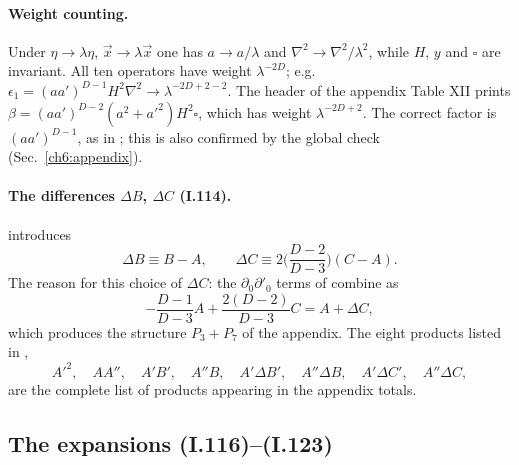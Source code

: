 \paragraph{Weight counting.} Under $\eta\to\lambda\eta$, $\vec x\to\lambda\vec x$ one has $a\to a/\lambda$ and $\nabla^2\to\nabla^2/\lambda^2$, while
$H$, $y$ and $\square$ are invariant. All ten operators have weight $\lambda^{-2D}$; e.g.\ $\epsilon_1=(aa')^{D-1}H^2\nabla^2\to\lambda^{-2D+2-2}$.
The header of the appendix Table XII prints $\beta=(aa')^{D-2}(a^2+a'^2)H^2\square$, which has weight $\lambda^{-2D+2}$. The correct factor is
$(aa')^{D-1}$, as in ; this is also confirmed by the global check (Sec.~\ref{ch6:appendix}).

\paragraph{The differences $\Delta B$, $\Delta C$ (I.114).} \PI{} introduces
\begin{equation}
\Delta B\equiv B-A,\qquad \Delta C\equiv2\Big(\frac{D-2}{D-3}\Big)(C-A). \tag{I.114}
\end{equation}
The reason for this choice of $\Delta C$: the $\partial_0\partial'_0$ terms of  combine as
\begin{equation}
-\frac{D-1}{D-3}A+\frac{2(D-2)}{D-3}C=A+\Delta C,
\end{equation}
which produces the structure $P_3+P_7$ of the appendix. The eight products listed in ,
\begin{equation}
A'^2,\quad AA'',\quad A'B',\quad A''B,\quad A'\Delta B',\quad A''\Delta B,\quad A'\Delta C',\quad A''\Delta C, \tag{I.115}
\end{equation}
are the complete list of products appearing in the appendix totals.

\subsection{The expansions (I.116)--(I.123) \texorpdfstring{\tD}{}}
\label{ch6:expansions}

